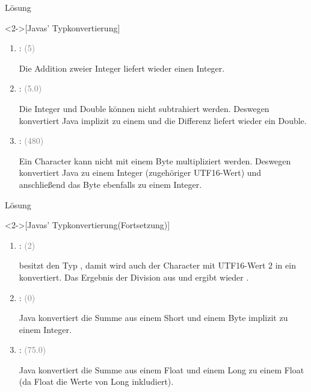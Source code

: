 \begin{frame}[c]{Lösung}
    \begin{solve}<2->[Javas' Typkonvertierung]
\pause\begin{enumerate}[<+(1)->]
    \widei
    \item {}:  \textcolor{gray}{(5)}\pause\par Die Addition zweier Integer liefert wieder einen Integer.
    \item {}:  \textcolor{gray}{(5.0)}\pause\par Die Integer und Double können nicht subtrahiert werden. Deswegen konvertiert Java  implizit zu einem  und die Differenz liefert wieder ein Double.
    \item {}:  \textcolor{gray}{(480)}\pause\par
    Ein Character kann nicht mit einem Byte multipliziert werden. Deswegen konvertiert Java  zu einem Integer (zugehöriger UTF16-Wert) und anschließend das Byte ebenfalls zu einem Integer.
\end{enumerate}
    \end{solve}
\end{frame}

\begin{frame}[c]{Lösung}
    \addtocounter{solve}{-1}%
    \begin{solve}<2->[Javas' Typkonvertierung\hfill(Fortsetzung)]
\pause\begin{enumerate}[<+(1)->]
    \widei
    \setcounter{enumi}{3}
    \item {}:  \textcolor{gray}{(2)}\pause\par
     besitzt den Typ , damit wird auch der Character mit UTF16-Wert \(2\) in ein  konvertiert. Das Ergebnis der Division aus  und  ergibt wieder .
    \item {}:  \textcolor{gray}{(0)}\pause\par
    Java konvertiert die Summe aus einem Short und einem Byte implizit zu einem Integer.
    \item {}:  \textcolor{gray}{(75.0)}\pause\par
    Java konvertiert die Summe aus einem Float und einem Long zu einem Float (da Float die Werte von Long inkludiert).
\end{enumerate}
    \end{solve}
\end{frame}

